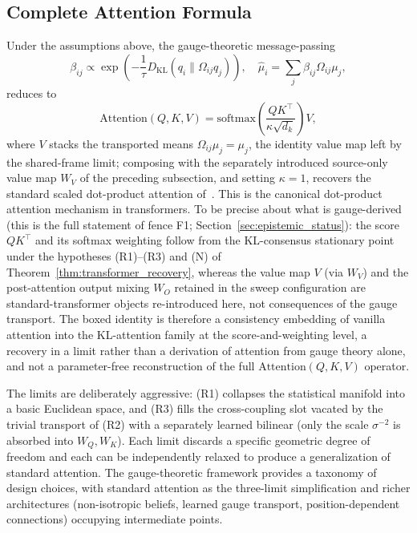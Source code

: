 \subsection{Complete Attention Formula}

Under the assumptions above, the gauge-theoretic message-passing
\begin{equation}
\beta_{ij} \propto \exp\left(-\frac{1}{\tau}D_{\mathrm{KL}}(q_i \| \Omega_{ij} q_j)\right), \quad \hat\mu_i = \sum_j \beta_{ij} \Omega_{ij}\mu_j,
\end{equation}
reduces to
\begin{equation}
\boxed{\mathrm{Attention}(Q,K,V) = \mathrm{softmax}\left(\frac{QK^\top}{\kappa\sqrt{d_k}}\right)V},
\end{equation}
where $V$ stacks the transported means $\Omega_{ij}\mu_j = \mu_j$, the identity value map left by the shared-frame limit; composing with the separately introduced source-only value map $W_V$ of the preceding subsection, and setting $\kappa = 1$, recovers the standard scaled dot-product attention of~\cite{vaswani2017attention}. This is the canonical dot-product attention mechanism in transformers. To be precise about what is gauge-derived (this is the full statement of fence F1; Section~\ref{sec:epistemic_status}): the score $QK^\top$ and its softmax weighting follow from the KL-consensus stationary point under the hypotheses (R1)--(R3) and (N) of Theorem~\ref{thm:transformer_recovery}, whereas the value map $V$ (via $W_V$) and the post-attention output mixing $W_O$ retained in the sweep configuration are standard-transformer objects re-introduced here, not consequences of the gauge transport. The boxed identity is therefore a consistency embedding of vanilla attention into the KL-attention family at the score-and-weighting level, a recovery in a limit rather than a derivation of attention from gauge theory alone, and not a parameter-free reconstruction of the full $\mathrm{Attention}(Q,K,V)$ operator.

The limits are deliberately aggressive: (R1) collapses the statistical manifold into a basic Euclidean space, and (R3) fills the cross-coupling slot vacated by the trivial transport of (R2) with a separately learned bilinear (only the scale $\sigma^{-2}$ is absorbed into $W_Q, W_K$). Each limit discards a specific geometric degree of freedom and each can be independently relaxed to produce a generalization of standard attention. The gauge-theoretic framework provides a taxonomy of design choices, with standard attention as the three-limit simplification and richer architectures (non-isotropic beliefs, learned gauge transport, position-dependent connections) occupying intermediate points.

